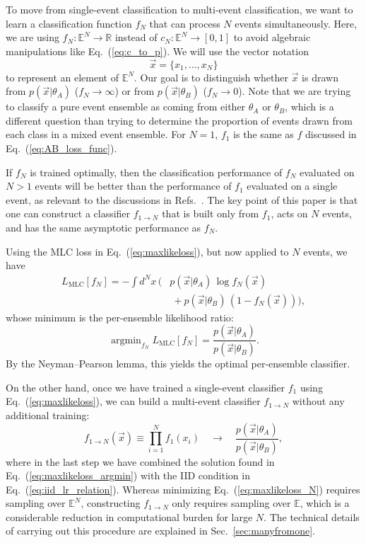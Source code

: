 \documentclass[aps,prx,reprint,preprintnumbers,superscriptaddress,nofootinbib,longbibliography,floatfix]{revtex4-2}
\DeclareMathOperator*{\argmin}{argmin}
\newcommand{\thetaup}{\theta_A}
\newcommand{\thetadown}{\theta_B}
\DeclareRobustCommand{\Sec}[1]{Sec.~\ref{sec:#1}}
\DeclareRobustCommand{\Eq}[1]{Eq.~(\ref{eq:#1})}
\DeclareRobustCommand{\Refs}[1]{Refs.~\cite{#1}}
\begin{document}
To move from single-event classification to multi-event classification, we want to learn a classification function $f_N$ that can process $N$ events simultaneously.
%
Here, we are using $f_N:\mathbb{E}^N\rightarrow \mathbb{R}$ instead of $c_N:\mathbb{E}^N\rightarrow [0,1]$ to avoid algebraic manipulations like \Eq{c_to_p}.
%
We will use the vector notation
%
\begin{equation}
    \vec{x} = \{x_1, \dots, x_N\}
\end{equation}
to represent an element of $\mathbb{E}^N$.
%
Our goal is to distinguish whether $\vec{x}$ is drawn from $p(\vec{x}|\thetaup)$ ($f_N \to \infty$) or from $p(\vec{x}|\thetadown)$ ($f_N \to 0$).
%
Note that we are trying to classify a pure event ensemble as coming from either $\thetaup$ or $\thetadown$, which is a different question than trying to determine the proportion of events drawn from each class in a mixed event ensemble.
%
For $N = 1$, $f_1$ is the same as $f$ discussed in \Eq{AB_loss_func}.


If $f_N$ is trained optimally, then the classification performance of $f_N$ evaluated on $N > 1$ events will be better than the performance of $f_1$ evaluated on a single event, as relevant to the discussions in  \Refs{Lai:2018ixk,Khosa:2019kxd,Du:2019civ,Mullin:2019mmh,Chang:2020rtc,Flesher:2020kuy,Lazzarin:2020uvv,Lai:2020byl}.
%
The key point of this paper is that one can construct a classifier $f_{1 \to N}$ that is built only from $f_1$, acts on $N$ events, and has the same asymptotic performance as $f_N$.


Using the MLC loss in \Eq{maxlikeloss}, but now applied to $N$ events, we have
%
\begin{align}
\nonumber L_\text{MLC}[f_N] = - \int d^N x \, \Big( & p(\vec{x}|\thetaup) \, \log f_N(\vec{x}) \\
& ~ + p(\vec{x}|\thetadown) \, (1 -f_N(\vec{x})) \Big),\label{eq:maxlikeloss_N}
\end{align}
%
whose minimum is the per-ensemble likelihood ratio:
%
\begin{equation}
\argmin_{f_N} L_\text{MLC}[f_N]= \frac{p(\vec{x}|\thetaup)}{p(\vec{x}|\thetadown)}.   
\end{equation}
%
By the Neyman–Pearson lemma, this yields the optimal per-ensemble classifier.


On the other hand, once we have trained a single-event classifier $f_1$ using \Eq{maxlikeloss}, we can build a multi-event classifier $f_{1\to N}$ without any additional training:
%
\begin{equation}
\label{eq:f_1_to_N}
f_{1 \to N}(\vec{x}) \equiv \prod_{i = 1}^N f_1(x_i) \quad \rightarrow \quad \frac{p(\vec{x}|\thetaup)}{p(\vec{x}|\thetadown)},
\end{equation}
%
where in the last step we have combined the solution found in \Eq{maxlikeloss_argmin} with the IID condition in \Eq{iid_lr_relation}.
%
Whereas minimizing \Eq{maxlikeloss_N} requires sampling over $\mathbb{E}^N$, constructing $f_{1 \to N}$ only requires sampling over $\mathbb{E}$, which is a considerable reduction in computational burden for large $N$.
%
The technical details of carrying out this procedure are explained in \Sec{manyfromone}.
\end{document}
